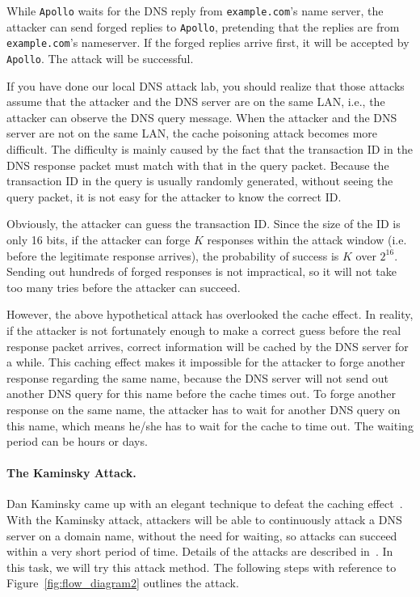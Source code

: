 While {\tt Apollo} waits for the DNS reply from {\tt example.com}'s name
server, the attacker can send forged replies to {\tt Apollo}, pretending 
that the replies are from {\tt example.com}'s nameserver. If the forged 
replies arrive first, it will be accepted by {\tt Apollo}. The attack will
be successful.


If you have done our local DNS attack lab, you should realize that 
those attacks assume that the attacker and the DNS server are on
the same LAN, i.e., the attacker can observe the DNS query message. 
When the attacker and the DNS server are not on the same LAN,
the cache poisoning attack becomes more difficult.
The difficulty is mainly caused by the fact that the transaction ID
in the DNS response packet must match with that 
in the query packet. Because the transaction ID in the query is 
usually randomly generated, without seeing the query packet,
it is not easy for the attacker to know the correct ID.


Obviously, the attacker can guess the transaction ID. Since the
size of the ID is only 16 bits, if the attacker can forge $K$ 
responses within the attack window (i.e. before the legitimate
response arrives), the probability of success is $K$ over $2^{16}$.
Sending out hundreds of forged responses is not impractical, so
it will not take too many tries before the attacker can succeed. 


However, the above hypothetical attack has overlooked the cache effect.
In reality, if the attacker is not fortunately enough to make a correct guess before
the real response packet arrives, correct information will be cached 
by the DNS server for a while. This caching effect makes it impossible
for the attacker to forge another response regarding the same 
name, because the DNS server will not send out another DNS query for 
this name before the cache times out.
To forge another response on the same name, the attacker has to 
wait for another DNS query on this name, which means he/she has to
wait for the cache to time out. The waiting period can be hours or days.


\paragraph{The Kaminsky Attack.} 
Dan Kaminsky came up with an elegant technique to defeat the caching
effect~\cite{dns:Kaminsky}.
With the Kaminsky attack, attackers will be able to continuously attack
a DNS server on a domain name, without the need for waiting, so
attacks can succeed within a very short period of time.
Details of the attacks are described in~\cite{dns:Kaminsky,seedbook}. 
In this task, we will try this attack method. The following steps with reference to 
Figure~\ref{fig:flow_diagram2} outlines the attack. 

